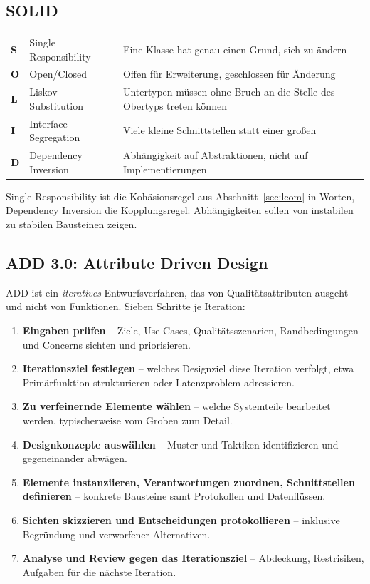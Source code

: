 \documentclass[12pt, a4paper]{article}
\begin{document}
\subsection{SOLID}

\begin{center}
\begin{tabular}{llp{7.2cm}}
\hline
\textbf{S} & Single Responsibility & Eine Klasse hat genau einen Grund, sich zu ändern \\
\textbf{O} & Open/Closed & Offen für Erweiterung, geschlossen für Änderung \\
\textbf{L} & Liskov Substitution & Untertypen müssen ohne Bruch an die Stelle des Obertyps treten können \\
\textbf{I} & Interface Segregation & Viele kleine Schnittstellen statt einer großen \\
\textbf{D} & Dependency Inversion & Abhängigkeit auf Abstraktionen, nicht auf Implementierungen \\
\hline
\end{tabular}
\end{center}

Single Responsibility ist die Kohäsionsregel aus Abschnitt~\ref{sec:lcom} in Worten,
Dependency Inversion die Kopplungsregel: Abhängigkeiten sollen von instabilen zu
stabilen Bausteinen zeigen.

\subsection{ADD 3.0: Attribute Driven Design}
\label{sec:add}

ADD ist ein \emph{iteratives} Entwurfsverfahren, das von Qualitätsattributen ausgeht
und nicht von Funktionen. Sieben Schritte je Iteration:

\begin{enumerate}
  \item \textbf{Eingaben prüfen} -- Ziele, Use Cases, Qualitätsszenarien,
        Randbedingungen und Concerns sichten und priorisieren.
  \item \textbf{Iterationsziel festlegen} -- welches Designziel diese Iteration
        verfolgt, etwa \glqq{}Primärfunktion strukturieren\grqq{} oder
        \glqq{}Latenzproblem adressieren\grqq{}.
  \item \textbf{Zu verfeinernde Elemente wählen} -- welche Systemteile bearbeitet
        werden, typischerweise vom Groben zum Detail.
  \item \textbf{Designkonzepte auswählen} -- Muster und Taktiken identifizieren und
        gegeneinander abwägen.
  \item \textbf{Elemente instanziieren, Verantwortungen zuordnen, Schnittstellen
        definieren} -- konkrete Bausteine samt Protokollen und Datenflüssen.
  \item \textbf{Sichten skizzieren und Entscheidungen protokollieren} -- inklusive
        Begründung und verworfener Alternativen.
  \item \textbf{Analyse und Review gegen das Iterationsziel} -- Abdeckung,
        Restrisiken, Aufgaben für die nächste Iteration.
\end{enumerate}
\end{document}
